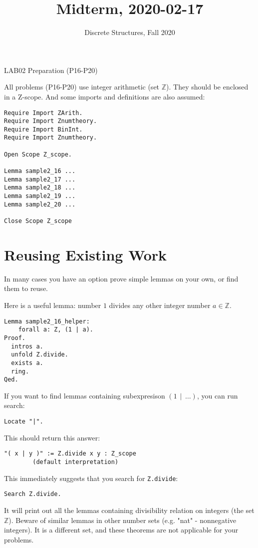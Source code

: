 \documentclass[jou]{apa6}
\title{Midterm, 2020-02-17}
\author{Discrete Structures, Fall 2020}
\affiliation{RBS}
\begin{document}
\thispagestyle{empty}

\twocolumn
{\Large LAB02 Preparation (P16-P20)}

All problems (P16-P20) use integer arithmetic (set $\mathbb{Z}$). 
They should be enclosed in a Z-scope. And some imports and definitions
are also assumed: 

\begin{verbatim}
Require Import ZArith.
Require Import Znumtheory.
Require Import BinInt.
Require Import Znumtheory.

Open Scope Z_scope.

Lemma sample2_16 ... 
Lemma sample2_17 ... 
Lemma sample2_18 ... 
Lemma sample2_19 ... 
Lemma sample2_20 ... 

Close Scope Z_scope
\end{verbatim}

\section{Reusing Existing Work}


In many cases you have an option \textendash{} 
prove simple lemmas on your own, or find them to reuse. 

Here is a useful lemma: number $1$ divides any other integer number $a \in \mathbb{Z}$.

\begin{verbatim}
Lemma sample2_16_helper: 
    forall a: Z, (1 | a). 
Proof.
  intros a. 
  unfold Z.divide.
  exists a.
  ring.
Qed.
\end{verbatim}

If you want to find lemmas containing subexpresison $(1 \,\mid\, \ldots)$, 
you can run search:

\begin{verbatim}
Locate "|".
\end{verbatim}

This should return this answer:

\begin{verbatim}
"( x | y )" := Z.divide x y : Z_scope
        (default interpretation)
\end{verbatim}

This immediately suggests that you search for {\tt Z.divide}:

\begin{verbatim}
Search Z.divide.
\end{verbatim}

It will print out all the lemmas containing divisibility relation on 
integers (the set $\mathbb{Z}$). Beware of similar lemmas in other number
sets (e.g. "nat" - nonnegative integers). It is a different set, and 
these theorems are not applicable for your problems. 
\end{document}
